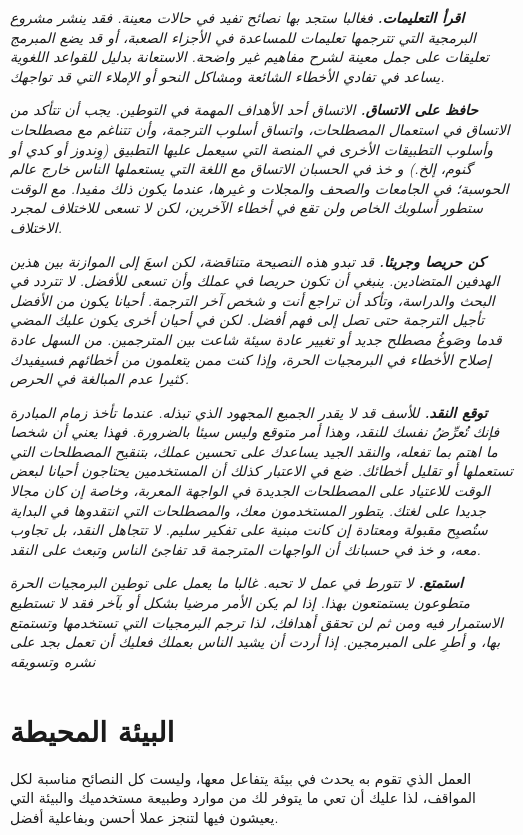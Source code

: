 {\it
{\bf اقرأ التعليمات.} فغالبا ستجد بها نصائح تفيد في حالات معينة. فقد
ينشر مشروع البرمجية التي تترجمها تعليمات للمساعدة في الأجزاء الصعبة، أو
قد يضع المبرمج تعليقات على جمل معينة لشرح مفاهيم غير واضحة. الاستعانة
بدليل للقواعد اللغوية يساعد في تفادي الأخطاء الشائعة ومشاكل النحو أو
الإملاء التي قد تواجهك.}

{\it
{\bf حافظ على الاتساق.} الاتساق أحد الأهداف المهمة في التوطين. يجب أن
تتأكد من الاتساق في استعمال المصطلحات، واتساق أسلوب الترجمة، وأن تتناغم
مع مصطلحات وأسلوب التطبيقات الأخرى في المنصة التي سيعمل عليها التطبيق
(وِندوز أو كدي أو گنوم، إلخ.) و خذ في الحسبان الاتساق مع اللغة التي
يستعملها الناس خارج عالم الحوسبة؛ في الجامعات والصحف والمجلات و غيرها،
عندما يكون ذلك مفيدا. مع الوقت ستطور أسلوبك الخاص ولن تقع في أخطاء
الآخرين، لكن لا تسعى للاختلاف لمجرد الاختلاف.}

{\it
{\bf كن حريصا وجريئا.} قد تبدو هذه النصيحة متناقضة، لكن اسعَ إلى
الموازنة بين هذين الهدفين المتضادين. ينبغي أن تكون حريصا في عملك وأن
تسعى للأفضل. لا تتردد في البحث والدراسة، وتأكد أن تراجع أنت و شخص آخر
الترجمة. أحيانا يكون من الأفضل تأجيل الترجمة حتى تصل إلى فهم أفضل. لكن
في أحيان أخرى يكون عليك المضي قدما وصَوغُ مصطلح جديد أو تغيير عادة سيئة
شاعت بين المترجمين. من السهل عادة إصلاح الأخطاء في البرمجيات الحرة،
وإذا كنت ممن يتعلمون من أخطائهم فسيفيدك كثيرا عدم المبالغة في الحرص.}

{\it
{\bf توقع النقد.} للأسف قد لا يقدر الجميع المجهود الذي تبذله. عندما تأخذ
زمام المبادرة فإنك تُعرِّضُ نفسك للنقد، وهذا أمر متوقع وليس سيئا
بالضرورة. فهذا يعني أن شخصا ما اهتم بما تفعله، والنقد الجيد يساعدك على
تحسين عملك، بتنقيح المصطلحات التي تستعملها أو تقليل أخطائك. ضع في
الاعتبار كذلك أن المستخدمين يحتاجون أحيانا لبعض الوقت للاعتياد على
المصطلحات الجديدة في الواجهة المعربة، وخاصة إن كان مجالا جديدا على
لغتك. يتطور المستخدمون معك، والمصطلحات التي انتقدوها في البداية ستُصبِح
مقبولة ومعتادة إن كانت مبنية على تفكير سليم. لا تتجاهل النقد، بل تجاوب
معه، و خذ في حسبانك أن الواجهات المترجمة قد تفاجئ الناس وتبعث على
النقد.}

{\it
{\bf استمتع.} لا تتورط في عمل لا تحبه. غالبا ما يعمل على توطين البرمجيات
الحرة متطوعون يستمتعون بهذا. إذا لم يكن الأمر مرضيا بشكل أو بآخر فقد لا
تستطيع الاستمرار فيه ومن ثم لن تحقق أهدافك، لذا ترجم البرمجيات التي
تستخدمها وتستمتع بها، و أطرِ على المبرمجين. إذا أردت أن يشيد الناس
بعملك فعليك أن تعمل بجد على نشره وتسويقه}

\section{البيئة المحيطة}
العمل الذي تقوم به يحدث في بيئة يتفاعل معها، وليست كل النصائح مناسبة لكل
المواقف، لذا عليك أن تعي ما يتوفر لك من موارد وطبيعة مستخدميك والبيئة
التي يعيشون فيها لتنجز عملا أحسن وبفاعلية أفضل.

